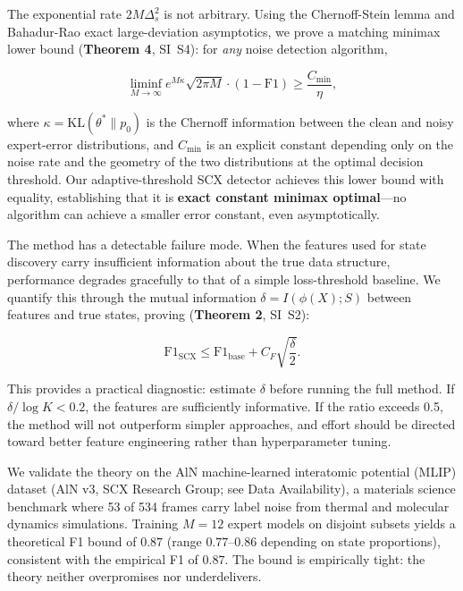 \documentclass[12pt,a4paper]{article}
\begin{document}
The exponential rate $2M\Delta_s^2$ is not arbitrary. Using the Chernoff-Stein lemma and Bahadur-Rao exact large-deviation asymptotics, we prove a matching minimax lower bound (\textbf{Theorem 4}, SI~S4): for \emph{any} noise detection algorithm,

\begin{equation}
\liminf_{M\to\infty} e^{M\kappa} \sqrt{2\pi M} \cdot (1 - \mathrm{F1}) \geq \frac{C_{\min}}{\eta},
\end{equation}

where $\kappa = \mathrm{KL}(\theta^* \| p_0)$ is the Chernoff information between the clean and noisy expert-error distributions, and $C_{\min}$ is an explicit constant depending only on the noise rate and the geometry of the two distributions at the optimal decision threshold. Our adaptive-threshold SCX detector achieves this lower bound with equality, establishing that it is \textbf{exact constant minimax optimal}---no algorithm can achieve a smaller error constant, even asymptotically.

The method has a detectable failure mode. When the features used for state discovery carry insufficient information about the true data structure, performance degrades gracefully to that of a simple loss-threshold baseline. We quantify this through the mutual information $\delta = I(\phi(X); S)$ between features and true states, proving (\textbf{Theorem 2}, SI~S2):

\begin{equation}
\mathrm{F1}_{\mathrm{SCX}} \leq \mathrm{F1}_{\mathrm{base}} + C_F \sqrt{\frac{\delta}{2}}.
\end{equation}

This provides a practical diagnostic: estimate $\delta$ before running the full method. If $\delta / \log K < 0.2$, the features are sufficiently informative. If the ratio exceeds 0.5, the method will not outperform simpler approaches, and effort should be directed toward better feature engineering rather than hyperparameter tuning.

We validate the theory on the AlN machine-learned interatomic potential (MLIP) dataset (AlN v3, SCX Research Group; see Data Availability), a materials science benchmark where 53 of 534 frames carry label noise from thermal and molecular dynamics simulations. Training $M=12$ expert models on disjoint subsets yields a theoretical F1 bound of $0.87$ (range $0.77$--$0.86$ depending on state proportions), consistent with the empirical F1 of $0.87$. The bound is empirically tight: the theory neither overpromises nor underdelivers.
\end{document}
